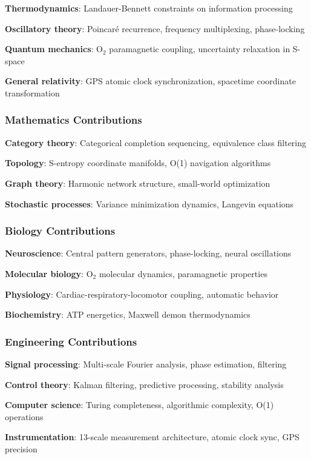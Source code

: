 \documentclass[11pt,onecolumn]{article}
\begin{document}
\textbf{Thermodynamics}: Landauer-Bennett constraints on information processing

\textbf{Oscillatory theory}: Poincaré recurrence, frequency multiplexing, phase-locking

\textbf{Quantum mechanics}: O$_2$ paramagnetic coupling, uncertainty relaxation in S-space

\textbf{General relativity}: GPS atomic clock synchronization, spacetime coordinate transformation

\subsubsection{Mathematics Contributions}

\textbf{Category theory}: Categorical completion sequencing, equivalence class filtering

\textbf{Topology}: S-entropy coordinate manifolds, O(1) navigation algorithms

\textbf{Graph theory}: Harmonic network structure, small-world optimization

\textbf{Stochastic processes}: Variance minimization dynamics, Langevin equations

\subsubsection{Biology Contributions}

\textbf{Neuroscience}: Central pattern generators, phase-locking, neural oscillations

\textbf{Molecular biology}: O$_2$ molecular dynamics, paramagnetic properties

\textbf{Physiology}: Cardiac-respiratory-locomotor coupling, automatic behavior

\textbf{Biochemistry}: ATP energetics, Maxwell demon thermodynamics

\subsubsection{Engineering Contributions}

\textbf{Signal processing}: Multi-scale Fourier analysis, phase estimation, filtering

\textbf{Control theory}: Kalman filtering, predictive processing, stability analysis

\textbf{Computer science}: Turing completeness, algorithmic complexity, O(1) operations

\textbf{Instrumentation}: 13-scale measurement architecture, atomic clock sync, GPS precision
\end{document}
